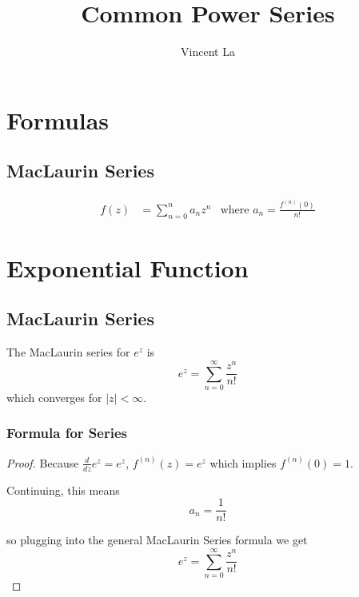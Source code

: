 \documentclass[]{article}
\title{Common Power Series}
\author{Vincent La}
\begin{document}
\maketitle

\section{Formulas}
\subsection{MacLaurin Series}
\[\begin{aligned}
f(z) &= \sum^{n}_{n=0} a_n z^n & \text{where } a_n = \frac{f^{(n)}(0)}{n!}
\end{aligned}\]

\section{Exponential Function}
\subsection{MacLaurin Series}
The MacLaurin series for $e^z$ is 
\[e^z  = \sum^{\infty}_{n=0} \frac{z^n}{n!} \]
which converges for $|z| < \infty$.

\subsubsection{Formula for Series}
\begin{proof}
	Because $\frac{d}{dz} e^z = e^z$, $f^{(n)}(z) = e^z$ which implies $f^{(n)}(0) = 1$. 
	
	\bigskip
	
	Continuing, this means
	\[a_n = \frac{1}{n!} \]
	
	so plugging into the general MacLaurin Series formula we get
	\[e^z = \sum^{\infty}_{n=0} \frac{z^n}{n!}\]
\end{proof}
	
\end{document}
